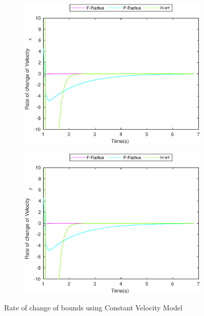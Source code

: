 \begin{figure}[h]
\begin{subfigure}{.5\linewidth}
\includegraphics[width=.9\linewidth]{figures/BoundChange/CV/cv_bound_changeVelocity_x}
\end{subfigure}
\begin{subfigure}{.5\linewidth}
\centering
\includegraphics[width=.9\linewidth]{figures/BoundChange/CV/cv_bound_changeVelocity_y}
\end{subfigure}
\caption{Rate of change of bounds using Constant Velocity Model}
\end{figure}


